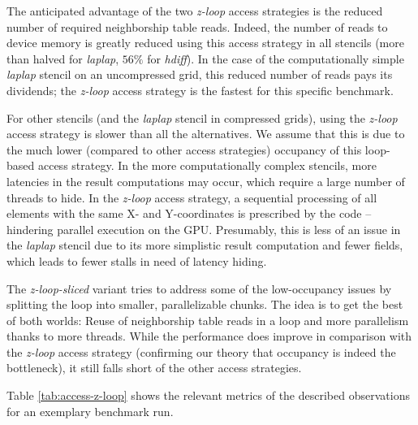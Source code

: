 The anticipated advantage of the two \emph{z-loop} access strategies is the reduced number of required neighborship table reads. Indeed, the number of reads to device memory is greatly reduced using this access strategy in all stencils (more than halved for \emph{laplap}, $56\%$ for \emph{hdiff}). In the case of the computationally simple \emph{laplap} stencil on an uncompressed grid, this reduced number of reads pays its dividends; the \emph{z-loop} access strategy is the fastest for this specific benchmark.

For other stencils (and the \emph{laplap} stencil in compressed grids), using the \emph{z-loop} access strategy is slower than all the alternatives.  We assume that this is due to the much lower (compared to other access strategies) occupancy of this loop-based access strategy. In the more computationally complex stencils, more latencies in the result computations may occur, which require a large number of threads to hide. In the \emph{z-loop} access strategy, a sequential processing of all elements with the same X- and Y-coordinates is prescribed by the code -- hindering parallel execution on the GPU. Presumably, this is less of an issue in the \emph{laplap} stencil due to its more simplistic result computation and fewer fields, which leads to fewer stalls in need of latency hiding.

The \emph{z-loop-sliced} variant tries to address some of the low-occupancy issues by splitting the loop into smaller, parallelizable chunks. The idea is to get the best of both worlds: Reuse of neighborship table reads in a loop and more parallelism thanks to more threads. While the performance does improve in comparison with the \emph{z-loop} access strategy (confirming our theory that occupancy is indeed the bottleneck), it still falls short of the other access strategies.

Table \ref{tab:access-z-loop} shows the relevant metrics of the described observations for an exemplary benchmark run.




